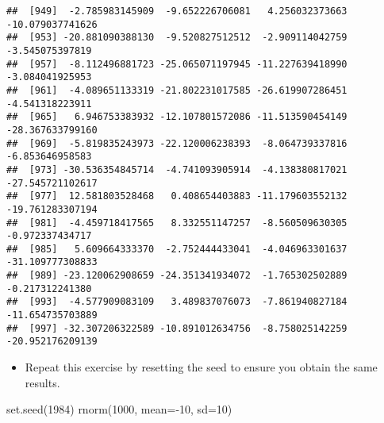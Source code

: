 \documentclass[
]{article}
\newenvironment{Shaded}{\begin{snugshade}}{\end{snugshade}}
\newcommand{\AttributeTok}[1]{\textcolor[rgb]{0.77,0.63,0.00}{#1}}
\newcommand{\DecValTok}[1]{\textcolor[rgb]{0.00,0.00,0.81}{#1}}
\newcommand{\FunctionTok}[1]{\textcolor[rgb]{0.00,0.00,0.00}{#1}}
\newcommand{\NormalTok}[1]{#1}
\newcommand{\SpecialCharTok}[1]{\textcolor[rgb]{0.00,0.00,0.00}{#1}}
\providecommand{\tightlist}{%
  \setlength{\itemsep}{0pt}\setlength{\parskip}{0pt}}
\begin{document}
\begin{verbatim}
##  [949]  -2.785983145909  -9.652226706081   4.256032373663 -10.079037741626
##  [953] -20.881090388130  -9.520827512512  -2.909114042759  -3.545075397819
##  [957]  -8.112496881723 -25.065071197945 -11.227639418990  -3.084041925953
##  [961]  -4.089651133319 -21.802231017585 -26.619907286451  -4.541318223911
##  [965]   6.946753383932 -12.107801572086 -11.513590454149 -28.367633799160
##  [969]  -5.819835243973 -22.120006238393  -8.064739337816  -6.853646958583
##  [973] -30.536354845714  -4.741093905914  -4.138380817021 -27.545721102617
##  [977]  12.581803528468   0.408654403883 -11.179603552132 -19.761283307194
##  [981]  -4.459718417565   8.332551147257  -8.560509630305  -0.972337434717
##  [985]   5.609664333370  -2.752444433041  -4.046963301637 -31.109777308833
##  [989] -23.120062908659 -24.351341934072  -1.765302502889  -0.217312241380
##  [993]  -4.577909083109   3.489837076073  -7.861940827184 -11.654735703889
##  [997] -32.307206322589 -10.891012634756  -8.758025142259 -20.952176209139
\end{verbatim}

\begin{itemize}
\tightlist
\item
  Repeat this exercise by resetting the seed to ensure you obtain the
  same results.
\end{itemize}

\begin{Shaded}
\begin{Highlighting}[]
\FunctionTok{set.seed}\NormalTok{(}\DecValTok{1984}\NormalTok{)}
\FunctionTok{rnorm}\NormalTok{(}\DecValTok{1000}\NormalTok{, }\AttributeTok{mean=}\SpecialCharTok{{-}}\DecValTok{10}\NormalTok{, }\AttributeTok{sd=}\DecValTok{10}\NormalTok{)}
\end{Highlighting}
\end{Shaded}
\end{document}
